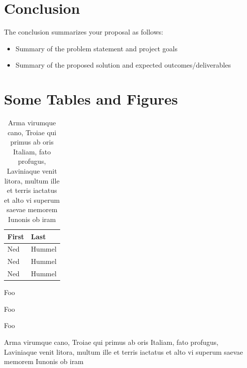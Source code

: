 \documentclass[ms,twoside,print]{nuthesis}
\begin{document}
\chapter{Conclusion}
The conclusion summarizes your proposal as follows:

\begin{itemize}
  \item Summary of the problem statement and project goals
  \item Summary of the proposed solution and expected outcomes/deliverables
\end{itemize}


\backmatter

\appendix

\chapter{Some Tables and Figures}

\begin{table}[h]
  \centering
  \begin{tabular}{ll}\toprule
    First & Last \\ \midrule
    Ned & Hummel \\
    Ned & Hummel \\
    Ned & Hummel \\ \bottomrule
  \end{tabular}
  \caption{Arma virumque cano, Troiae qui primus ab oris Italiam, fato profugus,
Laviniaque venit litora, multum ille et terris iactatus et alto vi
superum saevae memorem Iunonis ob iram}
  \label{tab:tabular}
\end{table}

\begin{table}[h]
  \centering

  \begin{compactitem}[\checkmark]
    \item Foo
    \item Foo
    \item Foo
    \end{compactitem}

  \caption{Arma virumque cano, Troiae qui primus ab oris Italiam, fato profugus,
Laviniaque venit litora, multum ille et terris iactatus et alto vi
superum saevae memorem Iunonis ob iram}
  \label{tab:list}
\end{table}
\end{document}
